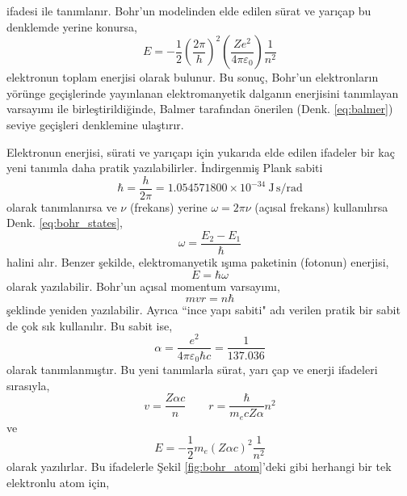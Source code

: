 \documentclass[a4paper,12pt, twoside]{article}
\begin{document}
ifadesi ile tanımlanır. Bohr'un modelinden elde edilen sürat ve yarıçap bu denklemde yerine konursa,
\begin{equation}
E = -\frac{1}{2} \left(\frac{2\pi}{h} \right)^2 \left(\frac{Ze^2}{4\pi \varepsilon_0} \right) \frac{1}{n^2}
\label{eq:bohr_elektron_energy2}
\end{equation}
elektronun toplam enerjisi olarak bulunur. Bu sonuç, Bohr'un elektronların yörünge geçişlerinde yayınlanan elektromanyetik dalganın enerjisini tanımlayan varsayımı ile birleştirildiğinde, Balmer tarafından önerilen (Denk. \ref{eq:balmer}) seviye geçişleri denklemine ulaştırır.

Elektronun enerjisi, sürati ve yarıçapı için yukarıda elde edilen ifadeler bir kaç yeni tanımla daha pratik yazılabilirler. İndirgenmiş Plank sabiti 
\begin{equation}
\hbar = \frac{h}{2\pi} = 1.054571800 \times 10^{-34}\ \text{J}\,\text{s}/\text{rad}
\label{eq:reduced_planck_const}
\end{equation}
olarak tanımlanırsa ve $\nu$ (frekans) yerine $\omega = 2\pi \nu$ (açısal frekans) kullanılırsa Denk. \ref{eq:bohr_states}, 
\begin{equation}
\omega = \frac{E_2 - E_1}{\hbar}
\label{eq:bohr_states_2pi}
\end{equation}
halini alır. Benzer şekilde, elektromanyetik ışıma paketinin (fotonun) enerjisi,
\begin{equation}
E = \hbar \omega
\label{eq:foton_energy_2pi}
\end{equation}
olarak yazılabilir. Bohr'un açısal momentum varsayımı,
\begin{equation}
m v r = n \hbar
\label{eq:bohr_allowed_states_2pi}
\end{equation}
şeklinde yeniden yazılabilir. Ayrıca ``ince yapı sabiti" adı verilen pratik bir sabit de çok sık kullanılır. Bu sabit ise,
\begin{equation}
\alpha = \frac{e^2}{4\pi\varepsilon_0\hbar c} =\frac{1}{137.036}
\label{eq:fine_structure_const}
\end{equation}
olarak tanımlanmıştır. Bu yeni tanımlarla sürat, yarı çap ve enerji ifadeleri sırasıyla,
\begin{equation}
v = \frac{Z \alpha c}{n} \hspace{24pt} r = \frac{\hbar}{m_e c Z \alpha} n^2
\label{eq:bohr_v_r_2pi}
\end{equation}
ve
\begin{equation}
E = -\frac{1}{2}m_e (Z \alpha c)^2 \frac{1}{n^2}
\label{eq:bohr_E_2pi}
\end{equation}
olarak yazılırlar. Bu ifadelerle Şekil \ref{fig:bohr_atom}'deki gibi herhangi bir tek elektronlu atom için,
\end{document}
